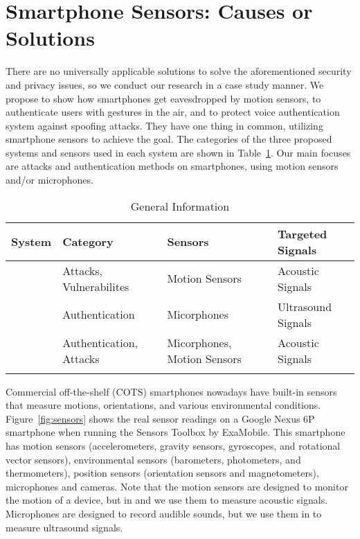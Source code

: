 \section{Smartphone Sensors: Causes  or Solutions}
There are no universally applicable solutions to solve the aforementioned security and privacy issues, so we conduct our research in a case study manner. We propose {\spp} to show how smartphones get eavesdropped  by motion sensors, {\uu} to authenticate users with gestures in the air, and {\mv} to protect voice authentication system against spoofing attacks. They have one thing in common, utilizing smartphone sensors to achieve the goal. The categories of the three proposed systems and sensors used in each system are shown in Table~\ref{tab:general}. Our main focuses are attacks and authentication methods on smartphones, using motion sensors and/or microphones.

\begin{table}
	\caption{General Information}
	\label{tab:general}
	\centering
	\begin{tabular}{llll}
		\toprule
		System & Category & Sensors & Targeted Signals\\
		\midrule
		{\spp} 	& Attacks, Vulnerabilites & Motion Sensors& Acoustic Signals\\
		{\uu}& Authentication & Micorphones& Ultrasound Signals\\
		{\mv}& Authentication, Attacks & Micorphones, Motion Sensors & Acoustic Signals\\
		\bottomrule& 
	\end{tabular}
\end{table}

Commercial off-the-shelf (COTS) smartphones nowadays have built-in sensors that measure motions, orientations, and various environmental conditions. Figure~\ref{fig:sensors} shows the real sensor readings on a Google Nexus 6P smartphone when running the Sensors Toolbox by ExaMobile. This smartphone has motion sensors (accelerometers, gravity sensors, gyroscopes, and rotational vector sensors), environmental sensors (barometers, photometers, and thermometers), position sensors (orientation sensors and magnetometers), microphones and cameras. Note that the motion sensors are designed to monitor the motion of a device, but in {\spp} and {\mv} we use them to measure acoustic signals. Microphones are designed to record audible sounds, but we use them in {\uu} to measure ultrasound signals.

